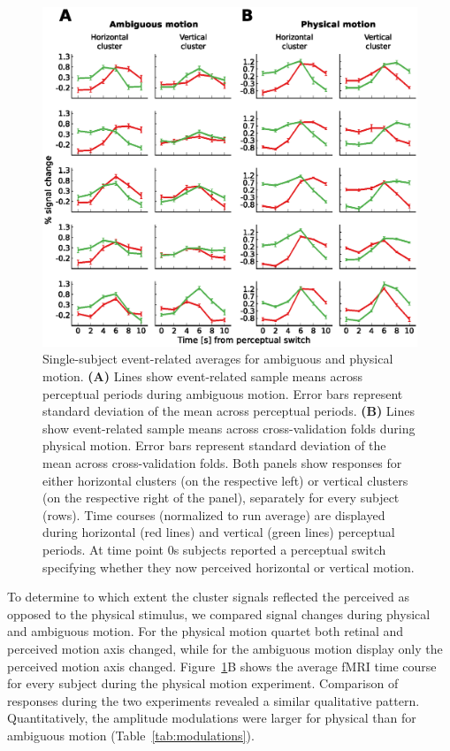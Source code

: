 \begin{figure}[htbp!]
\centering
\includegraphics[width=\textwidth]{figures/chapter_03/fig2.eps}
\caption{Single-subject event-related averages for ambiguous and physical motion. \textbf{(A)} Lines show event-related sample means across perceptual periods during ambiguous motion. Error bars represent standard deviation of the mean across perceptual periods. \textbf{(B)} Lines show event-related sample means across cross-validation folds during physical motion. Error bars represent standard deviation of the mean across cross-validation folds. Both panels show responses for either horizontal clusters (on the respective left) or vertical clusters (on the respective right of the panel), separately for every subject (rows). Time courses (normalized to run average) are displayed during horizontal (red lines) and vertical (green lines) perceptual periods. At time point 0s subjects reported a perceptual switch specifying whether they now perceived horizontal or vertical motion.}
\label{fig:single_subject_results}
\end{figure}

To determine to which extent the cluster signals reflected the perceived as opposed to the physical stimulus, we compared signal changes during physical and ambiguous motion. For the physical motion quartet both retinal and perceived motion axis changed, while for the ambiguous motion display only the perceived motion axis changed. Figure~\ref{fig:single_subject_results}B shows the average fMRI time course for every subject during the physical motion experiment. Comparison of responses during the two experiments revealed a similar qualitative pattern. Quantitatively, the amplitude modulations were larger for physical than for ambiguous motion (Table~\ref{tab:modulations}).

